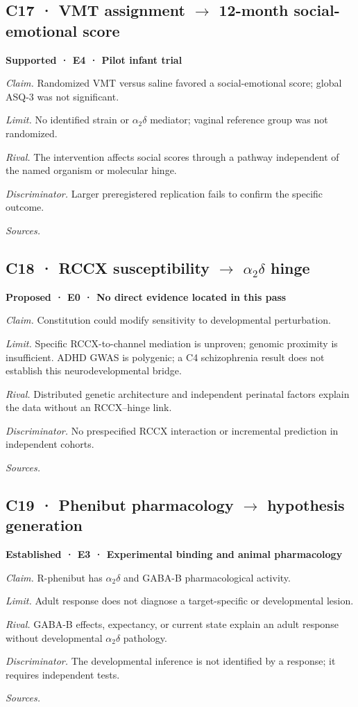 \subsection*{C17 · VMT assignment \ensuremath{\rightarrow} 12-month social-emotional score}
\noindent\textbf{Supported · E4 · Pilot infant trial}\par
\textit{Claim.} Randomized VMT versus saline favored a social-emotional score; global ASQ-3 was not significant.\par
\textit{Limit.} No identified strain or \ensuremath{\alpha_2\delta} mediator; vaginal reference group was not randomized.\par
\textit{Rival.} The intervention affects social scores through a pathway independent of the named organism or molecular hinge.\par
\textit{Discriminator.} Larger preregistered replication fails to confirm the specific outcome.\par
\textit{Sources.} \cite{ref20}\par
\subsection*{C18 · RCCX susceptibility \ensuremath{\rightarrow} \ensuremath{\alpha_2\delta} hinge}
\noindent\textbf{Proposed · E0 · No direct evidence located in this pass}\par
\textit{Claim.} Constitution could modify sensitivity to developmental perturbation.\par
\textit{Limit.} Specific RCCX-to-channel mediation is unproven; genomic proximity is insufficient. ADHD GWAS is polygenic; a C4 schizophrenia result does not establish this neurodevelopmental bridge.\par
\textit{Rival.} Distributed genetic architecture and independent perinatal factors explain the data without an RCCX–hinge link.\par
\textit{Discriminator.} No prespecified RCCX interaction or incremental prediction in independent cohorts.\par
\textit{Sources.} \cite{projP1,projP3,ref13,ref22,ref23,ref24}\par
\subsection*{C19 · Phenibut pharmacology \ensuremath{\rightarrow} hypothesis generation}
\noindent\textbf{Established · E3 · Experimental binding and animal pharmacology}\par
\textit{Claim.} R-phenibut has \ensuremath{\alpha_2\delta} and GABA-B pharmacological activity.\par
\textit{Limit.} Adult response does not diagnose a target-specific or developmental lesion.\par
\textit{Rival.} GABA-B effects, expectancy, or current state explain an adult response without developmental \ensuremath{\alpha_2\delta} pathology.\par
\textit{Discriminator.} The developmental inference is not identified by a response; it requires independent tests.\par
\textit{Sources.} \cite{ref18,projP3}\par
